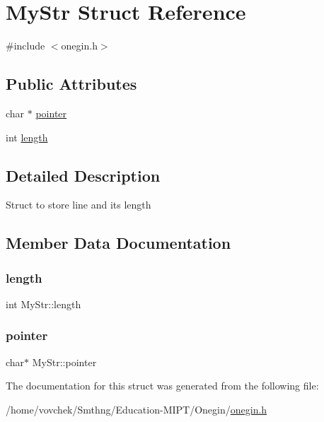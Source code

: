 \hypertarget{struct_my_str}{}\section{My\+Str Struct Reference}
\label{struct_my_str}


{\ttfamily \#include $<$onegin.\+h$>$}

\subsection*{Public Attributes}
\begin{DoxyCompactItemize}
\item 
char $\ast$ \hyperlink{struct_my_str_a46a731a64758ccc8a3c3f6ba531e860a}{pointer}
\item 
int \hyperlink{struct_my_str_abe750a45eca40ac1887722c2904d9006}{length}
\end{DoxyCompactItemize}


\subsection{Detailed Description}
Struct to store line and its length 

\subsection{Member Data Documentation}
\mbox{\label{struct_my_str_abe750a45eca40ac1887722c2904d9006}} 
\subsubsection{\texorpdfstring{length}{length}}
{\footnotesize\ttfamily int My\+Str\+::length}

\mbox{\label{struct_my_str_a46a731a64758ccc8a3c3f6ba531e860a}} 
\subsubsection{\texorpdfstring{pointer}{pointer}}
{\footnotesize\ttfamily char$\ast$ My\+Str\+::pointer}



The documentation for this struct was generated from the following file\+:\begin{DoxyCompactItemize}
\item 
/home/vovchek/\+Smthng/\+Education-\/\+M\+I\+P\+T/\+Onegin/\hyperlink{onegin_8h}{onegin.\+h}\end{DoxyCompactItemize}
